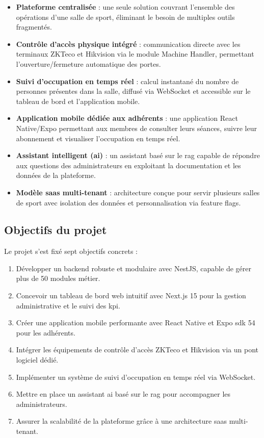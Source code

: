 \documentclass[../main.tex]{subfiles}
\begin{document}
\begin{itemize}
  \item \textbf{Plateforme centralis\'{e}e} : une seule solution couvrant l'ensemble des op\'{e}rations d'une salle de sport, \'{e}liminant le besoin de multiples outils fragment\'{e}s.
  \item \textbf{Contr\^{o}le d'acc\`{e}s physique int\'{e}gr\'{e}} : communication directe avec les terminaux ZKTeco et Hikvision via le module Machine Handler, permettant l'ouverture/fermeture automatique des portes.
  \item \textbf{Suivi d'occupation en temps r\'{e}el} : calcul instantan\'{e} du nombre de personnes pr\'{e}sentes dans la salle, diffus\'{e} via WebSocket et accessible sur le tableau de bord et l'application mobile.
  \item \textbf{Application mobile d\'{e}di\'{e}e aux adh\'{e}rents} : une application React Native/Expo permettant aux membres de consulter leurs s\'{e}ances, suivre leur abonnement et visualiser l'occupation en temps r\'{e}el.
  \item \textbf{Assistant intelligent (\acrshort{ai})} : un assistant bas\'{e} sur le \acrshort{rag} capable de r\'{e}pondre aux questions des administrateurs en exploitant la documentation et les donn\'{e}es de la plateforme.
  \item \textbf{Mod\`{e}le \acrshort{saas} multi-tenant} : architecture con\c{c}ue pour servir plusieurs salles de sport avec isolation des donn\'{e}es et personnalisation via feature flags.
\end{itemize}

\subsection{Objectifs du projet}
Le projet s'est fix\'{e} sept objectifs concrets :

\begin{enumerate}
  \item D\'{e}velopper un backend robuste et modulaire avec NestJS, capable de g\'{e}rer plus de 50 modules m\'{e}tier.
  \item Concevoir un tableau de bord web intuitif avec Next.js 15 pour la gestion administrative et le suivi des \acrshort{kpi}.
  \item Cr\'{e}er une application mobile performante avec React Native et Expo \acrshort{sdk} 54 pour les adh\'{e}rents.
  \item Int\'{e}grer les \'{e}quipements de contr\^{o}le d'acc\`{e}s ZKTeco et Hikvision via un pont logiciel d\'{e}di\'{e}.
  \item Impl\'{e}menter un syst\`{e}me de suivi d'occupation en temps r\'{e}el via WebSocket.
  \item Mettre en place un assistant \acrshort{ai} bas\'{e} sur le \acrshort{rag} pour accompagner les administrateurs.
  \item Assurer la scalabilit\'{e} de la plateforme gr\^{a}ce \`{a} une architecture \acrshort{saas} multi-tenant.
\end{enumerate}
\end{document}

